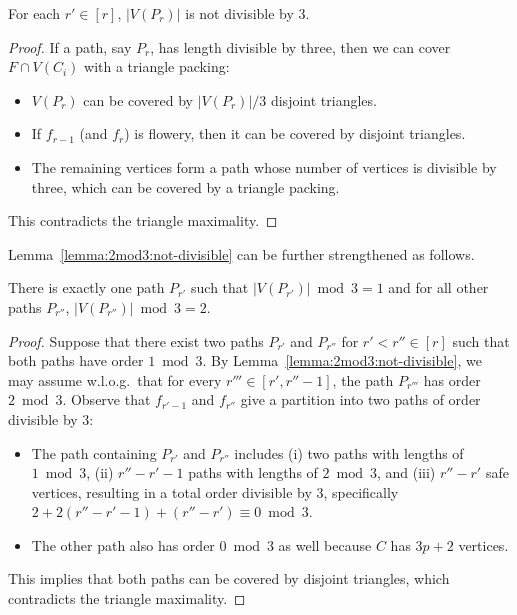 \begin{lemma} \label{lemma:2mod3:not-divisible}
  For each $r' \in [r]$, $|V(P_r)|$ is not divisible by 3.
\end{lemma}
\begin{proof}
  If a path, say $P_r$, has length divisible by three, then we can cover $F \cap V(C_i)$ with a triangle packing: 
  \begin{itemize}
    \item 
    $V(P_r)$ can be covered by $|V(P_r)|/3$ disjoint triangles.
    \item
    If $f_{r-1}$ (and $f_r$) is flowery, then it can be covered by disjoint triangles.
    \item
    The remaining vertices form a path whose number of vertices is divisible by three, which can be covered by a triangle packing.
  \end{itemize}
  This contradicts the triangle maximality.
\end{proof}

Lemma~\ref{lemma:2mod3:not-divisible} can be further strengthened as follows.

\begin{lemma} \label{lemma:2mod3:path-lengths}
  There is exactly one path $P_{r'}$ such that $|V(P_{r'})| \bmod 3 = 1$ and for all other paths $P_{r''}$, $|V(P_{r''})| \bmod 3 = 2$.
\end{lemma}
\begin{proof}
  Suppose that there exist two paths $P_{r'}$ and $P_{r''}$ for $r' < r'' \in [r]$ such that both paths have order $1 \bmod 3$.
  By Lemma~\ref{lemma:2mod3:not-divisible}, we may assume w.l.o.g.\ that for every $r''' \in [r', r'' - 1]$, the path $P_{r'''}$ has order $2 \bmod 3$.
  Observe that $f_{r'-1}$ and $f_{r''}$ give a partition into two paths of order divisible by 3:
  \begin{itemize}
    \item The path containing $P_{r'}$ and $P_{r''}$ includes (i) two paths with lengths of $1 \bmod 3$, (ii) $r'' - r' - 1$ paths with lengths of $2 \bmod 3$, and (iii) $r'' - r'$ safe vertices, resulting in a total order divisible by 3, specifically $2 + 2(r'' - r' - 1) + (r'' - r') \equiv 0 \bmod 3$.
    \item The other path also has order $0 \bmod 3$ as well because $C$ has $3p + 2$ vertices.
  \end{itemize}
  This implies that both paths can be covered by disjoint triangles, which contradicts the triangle maximality.
\end{proof}

